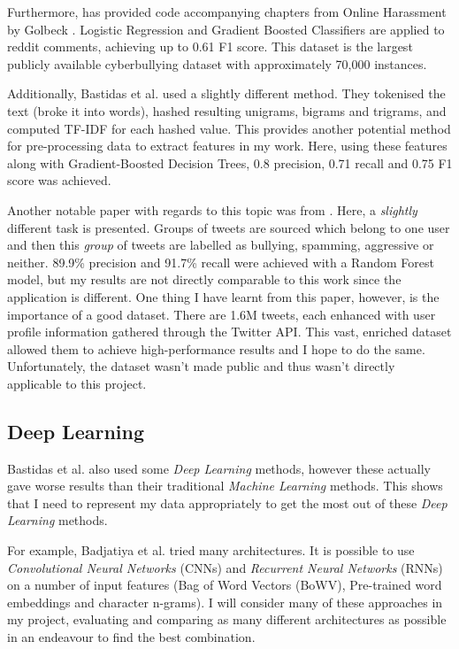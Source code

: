 \documentclass[12pt,a4paper]{article}
\begin{document}
Furthermore, \cite{Dixon} has provided code accompanying chapters from Online Harassment by Golbeck \citeyear{Golbeck}. Logistic Regression and Gradient Boosted Classifiers are applied to reddit comments, achieving up to 0.61 F1 score. This dataset is the largest publicly available cyberbullying dataset with approximately 70,000 instances. 

Additionally, Bastidas et al. \citeyear[p.2/3]{Hack} used a slightly different method. They tokenised the text (broke it into words), hashed resulting unigrams, bigrams and trigrams, and computed TF-IDF for each hashed value. This provides another potential method for pre-processing data to extract features in my work. Here, using these features along with Gradient-Boosted Decision Trees, 0.8 precision, 0.71 recall and 0.75 F1 score was achieved. 

Another notable paper with regards to this topic was from \cite{Birds}. Here, a \textit{slightly} different task is presented. Groups of tweets are sourced which belong to one user and then this \textit{group} of tweets are labelled as bullying, spamming, aggressive or neither. 89.9\% precision and 91.7\% recall were achieved with a Random Forest model, but my results are not directly comparable to this work since the application is different. One thing I have learnt from this paper, however, is the importance of a good dataset. There are 1.6M tweets, each enhanced with user profile information gathered through the Twitter API. This vast, enriched dataset allowed them to achieve high-performance results and I hope to do the same. Unfortunately, the dataset wasn't made public and thus wasn't directly applicable to this project.

\subsection{Deep Learning}
Bastidas et al. \citeyear[p.3]{Hack} also used some \textit{Deep Learning} methods, however these actually gave worse results than their traditional \textit{Machine Learning} methods. This shows that I need to represent my data appropriately to get the most out of these \textit{Deep Learning} methods.

For example, Badjatiya et al. \cite{Badjatiya} tried many architectures. It is possible to use \textit{Convolutional Neural Networks} (CNNs) and \textit{Recurrent Neural Networks} (RNNs) on a number of input features (Bag of Word Vectors (BoWV), Pre-trained word embeddings and character n-grams). I will consider many of these approaches in my project, evaluating and comparing as many different architectures as possible in an endeavour to find the best combination.
\end{document}
